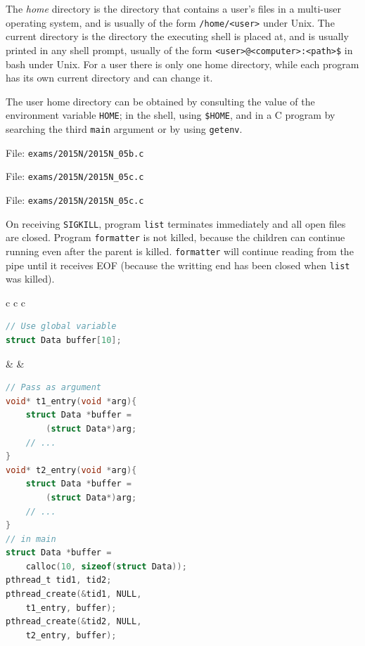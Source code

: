\documentclass{sope}
\begin{document}
The \emph{home} directory is the directory that contains a user's files in a multi-user operating system, and is usually of the form \texttt{/home/<user>} under Unix. The current directory is the directory the executing shell is placed at, and is usually printed in any shell prompt, usually of the form \texttt{<user>@<computer>:<path>\$} in bash under Unix. For a user there is only one home directory, while each program has its own current directory and can change it.

The user home directory can be obtained by consulting the value of the environment variable \texttt{HOME}; in the shell, using \texttt{\$HOME}, and in a C program by searching the third \texttt{main} argument or by using \texttt{getenv}.


File: \texttt{exams/2015N/2015N\_05b.c}


File: \texttt{exams/2015N/2015N\_05c.c}


File: \texttt{exams/2015N/2015N\_05c.c}


On receiving \texttt{SIGKILL}, program \texttt{list} terminates immediately and all open files are closed. Program \texttt{formatter} is not killed, because the children can continue running even after the parent is killed. \texttt{formatter} will continue reading from the pipe until it receives EOF (because the writting end has been closed when \texttt{list} was killed).

\begin{center}
    \lstset{
        showlines=true
    }
    \begin{tabular}{c c c}
        \begin{minipage}[t]{67mm}\begin{lstlisting}[language=C]
// Use global variable
struct Data buffer[10];
        \end{lstlisting}\end{minipage} & &
        \begin{minipage}[t]{80mm}\begin{lstlisting}[language=C]
// Pass as argument
void* t1_entry(void *arg){
    struct Data *buffer =
        (struct Data*)arg;
    // ...
}
void* t2_entry(void *arg){
    struct Data *buffer =
        (struct Data*)arg;
    // ...
}
// in main
struct Data *buffer =
    calloc(10, sizeof(struct Data));
pthread_t tid1, tid2;
pthread_create(&tid1, NULL,
    t1_entry, buffer);
pthread_create(&tid2, NULL,
    t2_entry, buffer);
        \end{lstlisting}\end{minipage}
    \end{tabular}
\end{center}
\end{document}
